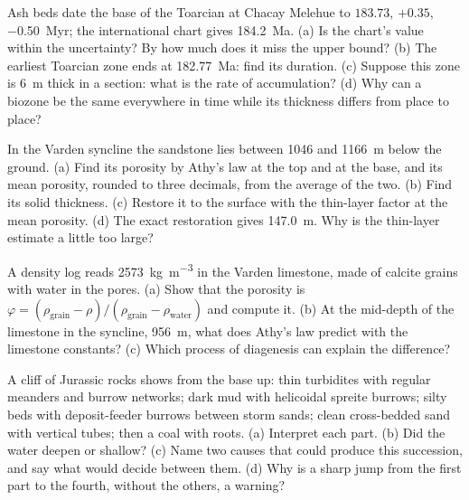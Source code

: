 \begin{exercise}[$\star\star$]\label{exo:b2:palaeoenvironments:6}
Ash beds date the base of the Toarcian at Chacay Melehue to $183.73$, $+0.35$, \qty{-0.50}{Myr};
the international chart gives \qty{184.2}{Ma}. (a) Is the chart's value within the uncertainty?
By how much does it miss the upper bound? (b) The earliest Toarcian zone ends at
\qty{182.77}{Ma}: find its duration. (c) Suppose this zone is \qty{6}{m} thick in a section:
what is the rate of accumulation? (d) Why can a biozone be the same everywhere in time while its
thickness differs from place to place?
\end{exercise}

\begin{exercise}[$\star\star$]\label{exo:b2:palaeoenvironments:7}
In the Varden syncline the sandstone lies between 1046 and \qty{1166}{m} below the ground. (a)
Find its porosity by Athy's law at the top and at the base, and its mean porosity, rounded to
three decimals, from the average of the two. (b) Find its solid thickness. (c) Restore it to the
surface with the thin-layer factor at the mean porosity. (d) The exact restoration gives
\qty{147.0}{m}. Why is the thin-layer estimate a little too large?
\end{exercise}

\begin{exercise}[$\star\star$]\label{exo:b2:palaeoenvironments:8}
A density log reads \qty{2573}{kg.m^{-3}} in the Varden limestone, made of calcite grains with
water in the pores. (a) Show that the porosity is $\varphi = (\rho_{\text{grain}} -
\rho)/(\rho_{\text{grain}} - \rho_{\text{water}})$ and compute it. (b) At the mid-depth of the
limestone in the syncline, \qty{956}{m}, what does Athy's law predict with the limestone constants?
(c) Which process of diagenesis can explain the difference?
\end{exercise}

\begin{exercise}[$\star\star$]\label{exo:b2:palaeoenvironments:9}
A cliff of Jurassic rocks shows from the base up: thin turbidites with regular meanders and burrow
networks; dark mud with helicoidal spreite burrows; silty beds with deposit-feeder burrows between
storm sands; clean cross-bedded sand with
vertical tubes; then a coal with roots. (a) Interpret each part. (b) Did the water deepen or
shallow? (c) Name two causes that could produce this succession, and say what would decide
between them. (d) Why is a sharp jump from the first part to the fourth, without the others, a
warning?
\end{exercise}

